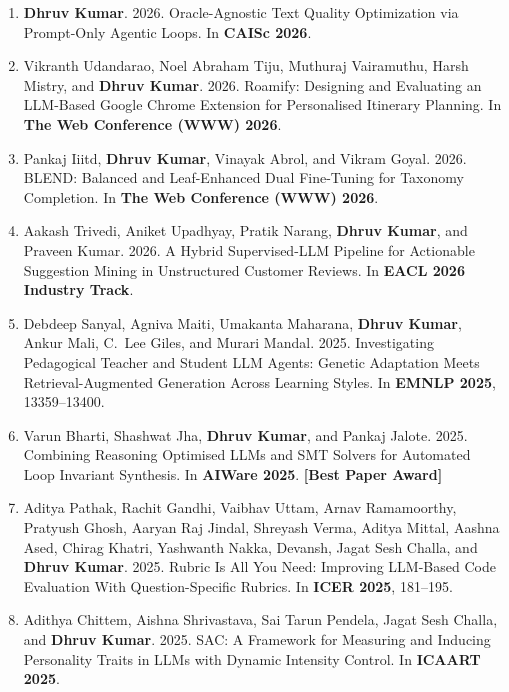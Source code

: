 \documentclass[10pt, a4paper]{article}
\newcommand{\award}[1]{%
  {\small\bfseries\color{AwardRed}[#1]}%
}
\begin{document}
\begin{enumerate}[label=\textbf{C\arabic*.}, leftmargin=2.8em, itemsep=0.3em]
\item \textbf{Dhruv Kumar}. 2026. Oracle-Agnostic Text Quality Optimization via Prompt-Only Agentic Loops. In \textbf{CAISc 2026}.

\item Vikranth Udandarao, Noel Abraham Tiju, Muthuraj Vairamuthu, Harsh Mistry, and \textbf{Dhruv Kumar}. 2026. Roamify: Designing and Evaluating an LLM-Based Google Chrome Extension for Personalised Itinerary Planning. In \textbf{The Web Conference (WWW) 2026}.

\item Pankaj Iiitd, \textbf{Dhruv Kumar}, Vinayak Abrol, and Vikram Goyal. 2026. BLEND: Balanced and Leaf-Enhanced Dual Fine-Tuning for Taxonomy Completion. In \textbf{The Web Conference (WWW) 2026}.

\item Aakash Trivedi, Aniket Upadhyay, Pratik Narang, \textbf{Dhruv Kumar}, and Praveen Kumar. 2026. A Hybrid Supervised-LLM Pipeline for Actionable Suggestion Mining in Unstructured Customer Reviews. In \textbf{EACL 2026 Industry Track}.

\item Debdeep Sanyal, Agniva Maiti, Umakanta Maharana, \textbf{Dhruv Kumar}, Ankur Mali, C.\ Lee Giles, and Murari Mandal. 2025. Investigating Pedagogical Teacher and Student LLM Agents: Genetic Adaptation Meets Retrieval-Augmented Generation Across Learning Styles. In \textbf{EMNLP 2025}, 13359--13400.

\item Varun Bharti, Shashwat Jha, \textbf{Dhruv Kumar}, and Pankaj Jalote. 2025. Combining Reasoning Optimised LLMs and SMT Solvers for Automated Loop Invariant Synthesis. In \textbf{AIWare 2025}. \award{Best Paper Award}

\item Aditya Pathak, Rachit Gandhi, Vaibhav Uttam, Arnav Ramamoorthy, Pratyush Ghosh, Aaryan Raj Jindal, Shreyash Verma, Aditya Mittal, Aashna Ased, Chirag Khatri, Yashwanth Nakka, Devansh, Jagat Sesh Challa, and \textbf{Dhruv Kumar}. 2025. Rubric Is All You Need: Improving LLM-Based Code Evaluation With Question-Specific Rubrics. In \textbf{ICER 2025}, 181--195.

\item Adithya Chittem, Aishna Shrivastava, Sai Tarun Pendela, Jagat Sesh Challa, and \textbf{Dhruv Kumar}. 2025. SAC: A Framework for Measuring and Inducing Personality Traits in LLMs with Dynamic Intensity Control. In \textbf{ICAART 2025}.


\end{enumerate}
\end{document}
